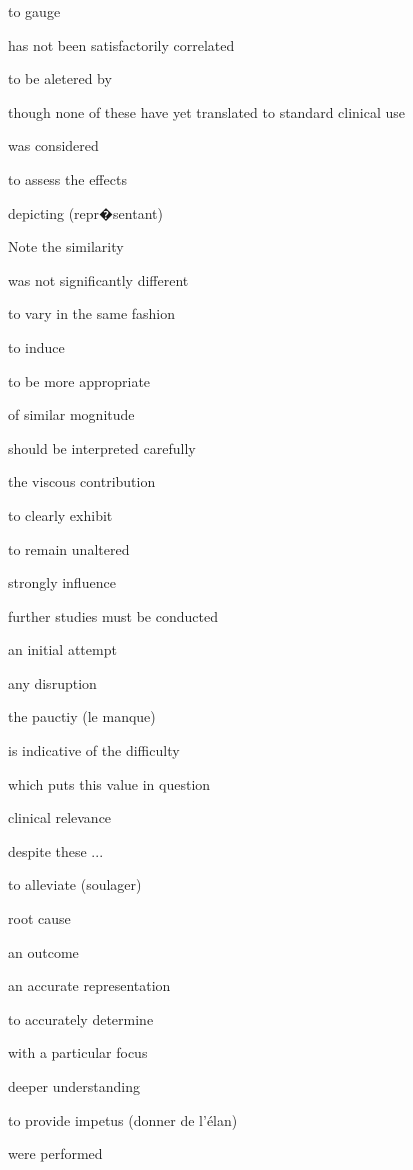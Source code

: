 \documentclass{article}
\begin{document}
to gauge

has not been satisfactorily
correlated

to be aletered by 

though none of these
have yet translated to standard clinical use

was considered

to assess the effects

depicting (repr�sentant)

Note the similarity

was not significantly different

to vary in the same fashion

to induce

to be more appropriate

of similar mognitude

should be interpreted carefully

the viscous contribution

to clearly exhibit

to remain unaltered

strongly influence

further studies must be conducted

an initial attempt

any disruption

the pauctiy (le manque)

is indicative of the difficulty

which puts this value in question

clinical relevance

despite these ...

to alleviate (soulager)

root cause

an outcome

an accurate representation

to accurately determine

with a particular focus

deeper understanding

to provide impetus (donner de l'élan)

were performed
\end{document}
